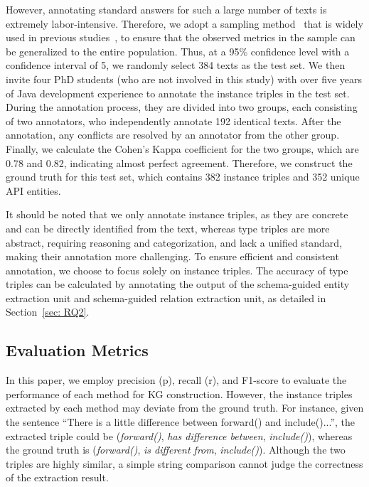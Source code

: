 However, annotating standard answers for such a large number of texts is extremely labor-intensive.
Therefore, we adopt a sampling method~\cite{Singh1996ElementsOS} that is widely used in previous studies~\cite{Li2018ImprovingAC, Liu2020GeneratingCB}, to ensure that the observed metrics in the sample can be generalized to the entire population.
Thus, at a 95\% confidence level with a confidence interval of 5, we randomly select 384 texts as the test set.
We then invite four PhD students (who are not involved in this study) with over five years of Java development experience to annotate the instance triples in the test set.
During the annotation process, they are divided into two groups, each consisting of two annotators, who independently annotate 192 identical texts.
After the annotation, any conflicts are resolved by an annotator from the other group.
Finally, we calculate the Cohen's Kappa coefficient for the two groups, which are 0.78 and 0.82, indicating almost perfect agreement.
Therefore, we construct the ground truth for this test set, which contains 382 instance triples and 352 unique API entities.

It should be noted that we only annotate instance triples, as they are concrete and can be directly identified from the text, whereas type triples are more abstract, requiring reasoning and categorization, and lack a unified standard, making their annotation more challenging.
To ensure efficient and consistent annotation, we choose to focus solely on instance triples.
The accuracy of type triples can be calculated by annotating the output of the schema-guided entity extraction unit and schema-guided
relation extraction unit, as detailed in Section~\ref{sec: RQ2}.



\subsection{Evaluation Metrics}
In this paper, we employ precision (p), recall (r), and F1-score to evaluate the performance of each method for KG construction.
However, the instance triples extracted by each method may deviate from the ground truth.
For instance, given the sentence ``There is a little difference between forward() and include()...'', the extracted triple could be (\textit{forward()}, \textit{has difference between}, \textit{include()}), whereas the ground truth is (\textit{forward()}, \textit{is different from}, \textit{include()}).
Although the two triples are highly similar, a simple string comparison cannot judge the correctness of the extraction result.

